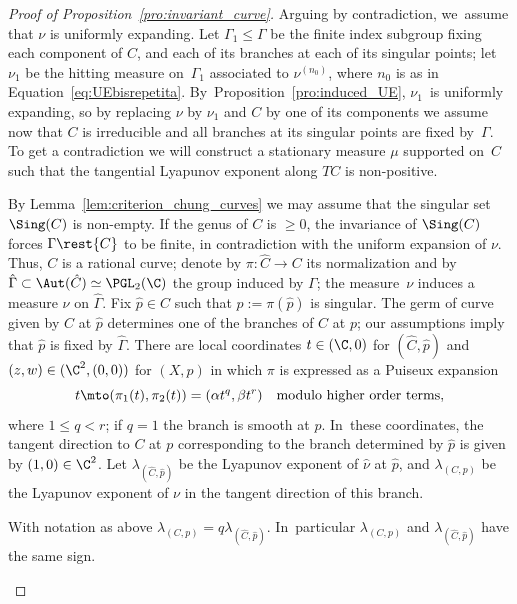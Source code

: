 \begin{proof}[Proof of Proposition~\ref{pro:invariant_curve}]
Arguing by contradiction, we~assume that $\nu$ is uniformly expanding. Let $\Gamma_1\leq \Gamma$
be the finite index subgroup fixing each component of $C$,
and each of its branches at each of its singular points; let $\nu_1$ be
the hitting measure on~$\Gamma_1$ associated to
$\nu^{(n_0)}$, where $n_0$ is as in Equation~\eqref{eq:UEbisrepetita}. By~Proposition~\ref{pro:induced_UE}, $\nu_1$~is uniformly
expanding, so by replacing $\nu$ by $\nu_1$ and $C$ by one of its components
we assume now that $C$ is irreducible and all branches at its
singular points are fixed by~$\Gamma$. To get a
contradiction we will construct a stationary measure $\mu$ supported on~$C$
such that the tangential Lyapunov exponent along $TC$ is non-positive.

By Lemma~\ref{lem:criterion_chung_curves} we may assume that
the singular set $\Sing(C)$ is non-empty.
If the genus of $C$ is $\geq 0$, the invariance of $\Sing(C)$ forces $\Gamma\rest{C}$ to be finite, in contradiction with the
uniform expansion of $\nu$. Thus, $C$ is a rational curve;
denote by $\pi:\hat C\to C$ its normalization and by $\hat \Gamma\subset \Aut(\hat{C})\simeq \PGL_2(\C)$
the group induced by $\Gamma$; the measure~$\nu$ induces a
measure $\hat \nu$ on $\hat \Gamma$.
Fix $\hat p\in \hat C$ such that $p:=\pi(\hat p)$ is singular. The germ of curve given by $\hat C$ at $\hat p$ determines one of the branches of $C$ at $p$; our assumptions imply that
$\hat p$ is fixed by $\hat\Gamma$. There are local coordinates $t\in (\C,0)$ for $(\hat C, \hat p)$ and $(z,w)\in (\C^2, (0,0))$ for $(X, p)$ in which
$\pi$ is expressed as a Puiseux expansion
\begin{equation*}
t\mto (\pi_1(t), \pi_2(t)) = (\alpha t^q , \beta t^r) \quad\text{modulo higher order terms},
\end{equation*}
where $1\leq q<r$; if $q=1$ the branch is smooth at $p$. In~these coordinates, the tangent direction to $C$ at $p$ corresponding to the branch determined by $\hat p$ is
given by $(1,0)\in \C^2$.
Let $\lambda_{(\hat C, \hat{p})}$ be the
Lyapunov exponent of $\hat \nu$ at $\hat p$, and $\lambda_{(C, p)}$ be the Lyapunov exponent of $\nu$
in the tangent direction of this branch.

\begin{lem}\label{lem:tangent_singular}
With notation as above
$\lambda_{(C, p)} = q \lambda_{(\hat C, \hat{p})}$. In~particular $\lambda_{(C, p)}$ and $\lambda_{(\hat C, \hat{p})}$
have the same sign.
\end{lem}


\end{proof}
